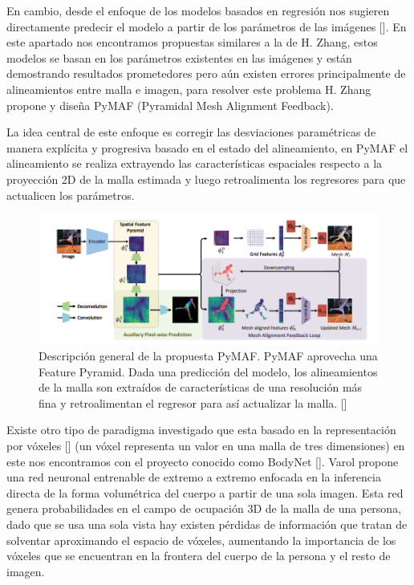 En cambio, desde el enfoque de los modelos basados en regresión nos sugieren directamente predecir el modelo a partir de los parámetros de las imágenes [\cite{pymaf}]. En este apartado nos encontramos propuestas similares a la de H. Zhang, estos modelos se basan en los parámetros existentes en las imágenes y están demostrando resultados prometedores pero aún existen errores principalmente de alineamientos entre malla e imagen, para resolver este problema H. Zhang  propone y diseña PyMAF (Pyramidal Mesh Alignment Feedback). 

La idea central de este enfoque es corregir las desviaciones paramétricas de manera explícita y progresiva basado en el estado del alineamiento, en PyMAF el alineamiento se realiza extrayendo las características espaciales respecto a la proyección 2D de la malla estimada y luego retroalimenta los regresores para que actualicen los parámetros.
\begin{figure}[H]
	\centering
	\includegraphics[scale=0.6]{imagenes/estadoarte3.png}
	\caption{ Descripción general de la propuesta PyMAF. PyMAF aprovecha una Feature Pyramid. Dada una predicción del modelo, los alineamientos de la malla son extraídos de características de una resolución más fina y retroalimentan el regresor para así actualizar la malla.  [\cite{pymaf}]   }
	\label{fig:figura4}
\end{figure}

Existe otro tipo de paradigma investigado que esta basado en la representación por vóxeles [\cite{Voxel}] (un vóxel representa un valor en una malla de tres dimensiones) en este nos encontramos con el proyecto conocido como BodyNet [\cite{bodynet}]. Varol propone una red neuronal entrenable de extremo a extremo enfocada en la inferencia directa de la forma volumétrica del cuerpo a partir de una sola imagen. Esta red genera probabilidades en el campo de ocupación 3D de la malla de una persona, dado que se usa una sola vista hay existen pérdidas de información que tratan de solventar aproximando el espacio de vóxeles, aumentando la importancia de los vóxeles que se encuentran en la frontera del cuerpo de la persona y el resto de imagen.

